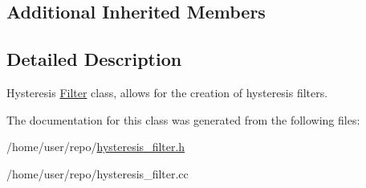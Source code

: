 \subsection*{Additional Inherited Members}


\subsection{Detailed Description}
Hysteresis \hyperlink{classFilter}{Filter} class, allows for the creation of hysteresis filters. 

The documentation for this class was generated from the following files\+:\begin{DoxyCompactItemize}
\item 
/home/user/repo/\hyperlink{hysteresis__filter_8h}{hysteresis\+\_\+filter.\+h}\item 
/home/user/repo/hysteresis\+\_\+filter.\+cc\end{DoxyCompactItemize}
